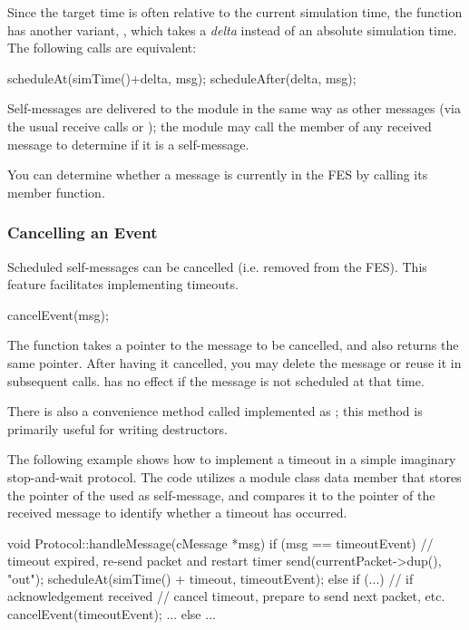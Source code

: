 Since the target time is often relative to the current simulation time,
the function has another variant, , which takes
a \textit{delta} instead of an absolute simulation time. The following
calls are equivalent:

\begin{cpp}
scheduleAt(simTime()+delta, msg);
scheduleAfter(delta, msg);
\end{cpp}

Self-messages are delivered to the module in the same way as other
messages (via the usual receive calls or );
the module may call the  member of any received
message to determine if it is a self-message.

You can determine whether a message is currently in the FES
by calling its  member function.

\subsubsection{Cancelling an Event}
\label{sec:simple-modules:cancelling}

Scheduled self-messages can be cancelled
 (i.e. removed from the FES).
This feature facilitates implementing timeouts.

\begin{cpp}
cancelEvent(msg);
\end{cpp}

The  function takes a pointer to the message to
be cancelled, and also returns the same pointer. After having it
cancelled, you may delete the message or reuse it in subsequent
 calls.  has no effect if
the message is not scheduled at that time.

There is also a convenience method called 
implemented as ;
this method is primarily useful for writing destructors.

The following example shows how to implement a timeout in a simple
imaginary stop-and-wait protocol. The code utilizes a 
module class data member that stores the pointer of the  used
as self-message, and compares it to the pointer of the received message
to identify whether a timeout has occurred.

\begin{cpp}
void Protocol::handleMessage(cMessage *msg)
{
    if (msg == timeoutEvent) {
        // timeout expired, re-send packet and restart timer
        send(currentPacket->dup(), "out");
        scheduleAt(simTime() + timeout, timeoutEvent);
    }
    else if (...) {  // if acknowledgement received
        // cancel timeout, prepare to send next packet, etc.
        cancelEvent(timeoutEvent);
        ...
    }
    else {
       ...
    }
}
\end{cpp}


